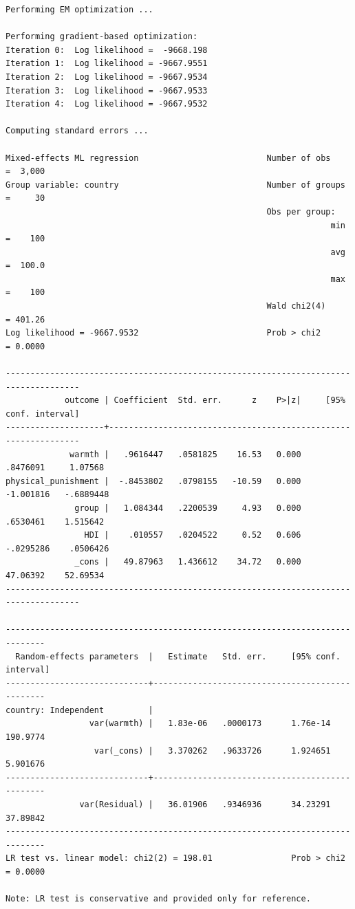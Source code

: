 \documentclass[
  letterpaper,
  DIV=11,
  numbers=noendperiod]{scrreprt}
\begin{document}
\begin{verbatim}
Performing EM optimization ...

Performing gradient-based optimization: 
Iteration 0:  Log likelihood =  -9668.198  
Iteration 1:  Log likelihood = -9667.9551  
Iteration 2:  Log likelihood = -9667.9534  
Iteration 3:  Log likelihood = -9667.9533  
Iteration 4:  Log likelihood = -9667.9532  

Computing standard errors ...

Mixed-effects ML regression                          Number of obs    =  3,000
Group variable: country                              Number of groups =     30
                                                     Obs per group:
                                                                  min =    100
                                                                  avg =  100.0
                                                                  max =    100
                                                     Wald chi2(4)     = 401.26
Log likelihood = -9667.9532                          Prob > chi2      = 0.0000

-------------------------------------------------------------------------------------
            outcome | Coefficient  Std. err.      z    P>|z|     [95% conf. interval]
--------------------+----------------------------------------------------------------
             warmth |   .9616447   .0581825    16.53   0.000     .8476091     1.07568
physical_punishment |  -.8453802   .0798155   -10.59   0.000    -1.001816   -.6889448
              group |   1.084344   .2200539     4.93   0.000     .6530461    1.515642
                HDI |    .010557   .0204522     0.52   0.606    -.0295286    .0506426
              _cons |   49.87963   1.436612    34.72   0.000     47.06392    52.69534
-------------------------------------------------------------------------------------

------------------------------------------------------------------------------
  Random-effects parameters  |   Estimate   Std. err.     [95% conf. interval]
-----------------------------+------------------------------------------------
country: Independent         |
                 var(warmth) |   1.83e-06   .0000173      1.76e-14    190.9774
                  var(_cons) |   3.370262   .9633726      1.924651    5.901676
-----------------------------+------------------------------------------------
               var(Residual) |   36.01906   .9346936      34.23291    37.89842
------------------------------------------------------------------------------
LR test vs. linear model: chi2(2) = 198.01                Prob > chi2 = 0.0000

Note: LR test is conservative and provided only for reference.
\end{verbatim}
\end{document}
